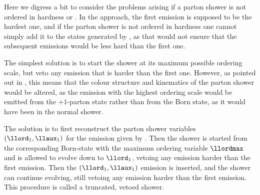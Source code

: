 Here we digress a bit to consider the problems arising if a parton
shower is not ordered in hardness or \kt. In the \POWHEG approach,
the first emission is supposed to be the hardest one, and if the parton
shower is not ordered in hardness one cannot simply add it to the
states generated by \POWHEG, as that would not ensure that the
subsequent emissions would be less hard than the first one.

The simplest solution is to start the shower at its maximum possible
ordering scale, but veto any emission that is harder than the first
\POWHEG one. However, as pointed out in \cite{Nason:2004rx}, this
means that the colour structure and kinematics of the parton shower
would be altered, as the emission with the highest ordering scale
would be emitted from the $+1$-parton state rather than from the Born
state, as it would have been in the normal shower.

The solution is to first reconstruct the parton shower variables
$(\llord_1,\llaux_1)$ for the emission given by \POWHEG. Then the
shower is started from the corresponding Born-state with the maximum
ordering variable $\llordmax$ and is allowed to evolve down to
$\llord_1$, vetoing any emission harder than the first emission. Then
the $(\llord_1,\llaux_1)$ emission is inserted, and the shower can
continue evolving, still vetoing any emission harder than the first
emission. This procedure is called a truncated, vetoed
shower\cite{Nason:2004rx}.

\mcsubsubsection{\MCatNLO}\label{sec:matching-mcatnlo}


